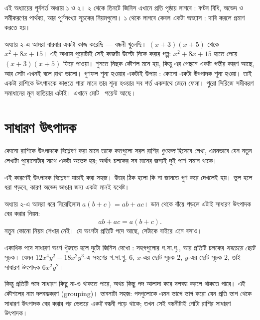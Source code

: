 \documentclass[11pt]{article}
\begin{document}

\noindent
এই অধ্যায়ের পূর্বশর্ত অধ্যায় ১ ও ২। ২ থেকে তিনটে জিনিস এখানে প্রতি
পৃষ্ঠায় লাগবে : বণ্টন বিধি, অভেদ ও সমীকরণের পার্থক্য, আর পূর্ণসংখ্যা সূচকের
নিয়মগুলো। ১ থেকে লাগবে কেবল একটা অভ্যাস : দাবি করলে প্রমাণ করতে হয়।

অধ্যায় ২-এ আমরা বারবার একটা কাজ করেছি --- বন্ধনী খুলেছি। $(x+3)(x+5)$ থেকে
$x^2 + 8x + 15$। এই অধ্যায় পুরোটাই সেই কাজটা উল্টো দিকে করার গল্প: $x^2 + 8x
+ 15$ হাতে পেয়ে $(x+3)(x+5)$ ফিরে পাওয়া। শুনতে নিছক কৌশল মনে হয়, কিন্তু এর
পেছনে একটা গভীর কারণ আছে, আর সেটা এখনই বলে রাখা ভালো। গুণফল শূন্য হওয়ার একটাই
উপায় : কোনো একটা উৎপাদক শূন্য হওয়া। তাই একটা রাশিকে উৎপাদকে ভাঙতে পারা মানে
তার শূন্য হওয়ার সব শর্ত একসাথে জেনে ফেলা। পুরো সিরিজে সমীকরণ সমাধানের মূল
হাতিয়ার এটাই। এখানে মোট \totalpoints\ পয়েন্ট আছে।

\section{সাধারণ উৎপাদক}

\begin{idea}[উৎপাদক বিশ্লেষণ মানে গুণকে উল্টো পথে হাঁটানো]
কোনো রাশিকে উৎপাদকে বিশ্লেষণ করা মানে তাকে কতগুলো সরল রাশির \emph{গুণফল} হিসেবে
লেখা, এমনভাবে যেন নতুন লেখাটা পুরোনোটার সাথে একটা অভেদ হয়; অর্থাৎ চলকের সব
মানের জন্যই দুই পাশ সমান থাকে।

এই কারণেই উৎপাদক বিশ্লেষণ যাচাই করা সহজ। উত্তর ঠিক হলো কি না জানতে গুণ করে
দেখলেই হয়। ভুল হলে ধরা পড়বে, কারণ অভেদ ভাঙার জন্য একটা মানই যথেষ্ট।
\end{idea}

\begin{idea}[সাধারণ উৎপাদক বণ্টন বিধিরই উল্টো পিঠ]
অধ্যায় ২-এ আমরা ধরে নিয়েছিলাম $a(b+c) = ab + ac$। ডান থেকে বাঁয়ে পড়লে
এটাই সাধারণ উৎপাদক বের করার নিয়ম:
\[
  ab + ac = a(b + c).
\]
নতুন কোনো নিয়ম শেখার নেই। যে অংশটা প্রতিটি পদে আছে, সেটাকে বাইরে এনে বসাও।

একাধিক পদে সাধারণ অংশ খুঁজতে হলে দুটো জিনিস দেখো : সহগগুলোর গ.সা.গু., আর
প্রতিটি চলকের \emph{সবচেয়ে ছোট} সূচক। যেমন $12x^{4}y^{2} - 18x^{2}y^{3}$-এ
সহগের গ.সা.গু. $6$, $x$-এর ছোট সূচক $2$, $y$-এর ছোট সূচক $2$, তাই সাধারণ উৎপাদক
$6x^{2}y^{2}$।
\end{idea}

\noindent
কিন্তু প্রতিটি পদে সাধারণ কিছু না-ও থাকতে পারে, অথচ কিছু পদ আলাদা করে দলবদ্ধ
করলে থাকতে পারে। এই কৌশলের নাম দলবদ্ধকরণ (grouping)। ভাবনাটা সহজ: পদগুলোকে এমন
ভাগে ভাগ করো যেন প্রতি ভাগ থেকে সাধারণ উৎপাদক বের করার পর ভেতরে \emph{একই}
বন্ধনী পড়ে থাকে; তখন সেই বন্ধনীটাই গোটা রাশির সাধারণ উৎপাদক।
\end{document}
